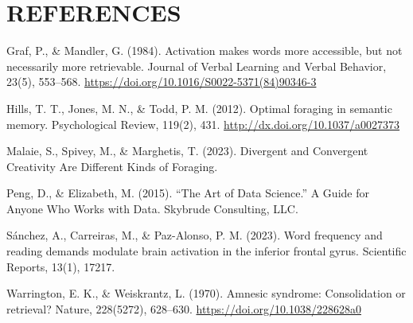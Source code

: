 \documentclass[
]{article}
\begin{document}
\hypertarget{references}{%
\section{REFERENCES}\label{references}}

Graf, P., \& Mandler, G. (1984). Activation makes words more accessible,
but not necessarily more retrievable. Journal of Verbal Learning and
Verbal Behavior, 23(5), 553--568.
\url{https://doi.org/10.1016/S0022-5371(84)90346-3}

Hills, T. T., Jones, M. N., \& Todd, P. M. (2012). Optimal foraging in
semantic memory. Psychological Review, 119(2), 431.
\url{http://dx.doi.org/10.1037/a0027373}

Malaie, S., Spivey, M., \& Marghetis, T. (2023). Divergent and
Convergent Creativity Are Different Kinds of Foraging.

Peng, D., \& Elizabeth, M. (2015). ``The Art of Data Science.'' A Guide
for Anyone Who Works with Data. Skybrude Consulting, LLC.

Sánchez, A., Carreiras, M., \& Paz-Alonso, P. M. (2023). Word frequency
and reading demands modulate brain activation in the inferior frontal
gyrus. Scientific Reports, 13(1), 17217.

Warrington, E. K., \& Weiskrantz, L. (1970). Amnesic syndrome:
Consolidation or retrieval? Nature, 228(5272), 628--630.
\url{https://doi.org/10.1038/228628a0}
\end{document}
